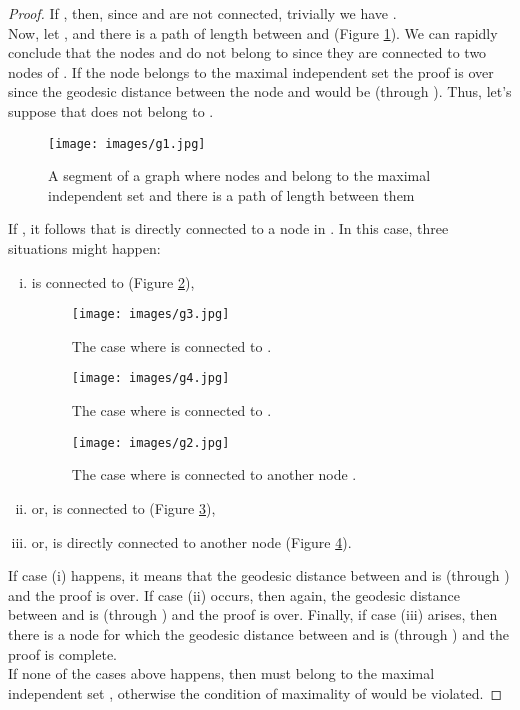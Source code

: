 \documentclass{article}
\begin{document}
\begin{proof}
	If , then, since  and  are not connected, trivially we have .\\
	Now, let , and there is a path of length  between  and  (Figure \ref{fig:g1}). We can rapidly conclude that the nodes  and  do not belong to  since they are connected to two nodes of . If the node  belongs to the maximal independent set  the proof is over since the geodesic distance between the node  and  would be  (through ). Thus, let's suppose that  does not belong to .
	
	\begin{figure}[!ht]
		\begin{center}
			\texttt{[image: images/g1.jpg]}
			\caption{A segment of a graph where nodes  and  belong to the maximal independent set  and there is a path of length  between them}
			\label{fig:g1}
		\end{center}
	\end{figure}
	
	If , it follows that  is directly connected to a node in . In this case, three situations might happen:
	\begin{enumerate}[(i)]
		\item  is connected to  (Figure \ref{fig:g3}),
		\begin{figure}[!ht]
			\begin{center}
				\texttt{[image: images/g3.jpg]}
				\caption{The case where  is connected to .}
				\label{fig:g3}
			\end{center}
		\end{figure}
		\begin{figure}[!ht]
			\begin{center}
				\texttt{[image: images/g4.jpg]}
				\caption{The case where  is connected to .}
				\label{fig:g4}
			\end{center}
		\end{figure}
		\begin{figure}[!ht]
			\begin{center}
				\texttt{[image: images/g2.jpg]}
				\caption{The case where  is connected to another node .}
				\label{fig:g2}
			\end{center}
		\end{figure}
		\item or,  is connected to  (Figure \ref{fig:g4}),
		\item or,  is directly connected to another node  (Figure \ref{fig:g2}).
	\end{enumerate}
	
	If case (i) happens, it means that the geodesic distance between  and  is  (through ) and the proof is over. If case (ii) occurs, then again, the geodesic distance between  and  is  (through ) and the proof is over. Finally, if case (iii) arises, then there is a node  for which the geodesic distance between  and  is  (through ) and the proof is complete.\bigskip\\
	If none of the cases above happens, then  must belong to the maximal independent set , otherwise the condition of maximality of  would be violated.
\end{proof}
\end{document}
